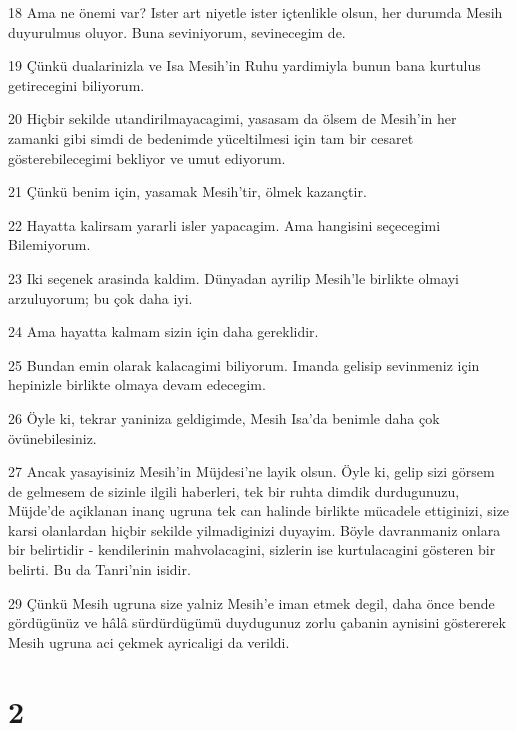\par 18 Ama ne önemi var? Ister art niyetle ister içtenlikle olsun, her durumda Mesih duyurulmus oluyor. Buna seviniyorum, sevinecegim de.
\par 19 Çünkü dualarinizla ve Isa Mesih'in Ruhu yardimiyla bunun bana kurtulus getirecegini biliyorum.
\par 20 Hiçbir sekilde utandirilmayacagimi, yasasam da ölsem de Mesih'in her zamanki gibi simdi de bedenimde yüceltilmesi için tam bir cesaret gösterebilecegimi bekliyor ve umut ediyorum.
\par 21 Çünkü benim için, yasamak Mesih'tir, ölmek kazançtir.
\par 22 Hayatta kalirsam yararli isler yapacagim. Ama hangisini seçecegimi Bilemiyorum.
\par 23 Iki seçenek arasinda kaldim. Dünyadan ayrilip Mesih'le birlikte olmayi arzuluyorum; bu çok daha iyi.
\par 24 Ama hayatta kalmam sizin için daha gereklidir.
\par 25 Bundan emin olarak kalacagimi biliyorum. Imanda gelisip sevinmeniz için hepinizle birlikte olmaya devam edecegim.
\par 26 Öyle ki, tekrar yaniniza geldigimde, Mesih Isa'da benimle daha çok övünebilesiniz.
\par 27 Ancak yasayisiniz Mesih'in Müjdesi'ne layik olsun. Öyle ki, gelip sizi görsem de gelmesem de sizinle ilgili haberleri, tek bir ruhta dimdik durdugunuzu, Müjde'de açiklanan inanç ugruna tek can halinde birlikte mücadele ettiginizi, size karsi olanlardan hiçbir sekilde yilmadiginizi duyayim. Böyle davranmaniz onlara bir belirtidir - kendilerinin mahvolacagini, sizlerin ise kurtulacagini gösteren bir belirti. Bu da Tanri'nin isidir.
\par 29 Çünkü Mesih ugruna size yalniz Mesih'e iman etmek degil, daha önce bende gördügünüz ve hâlâ sürdürdügümü duydugunuz zorlu çabanin aynisini göstererek Mesih ugruna aci çekmek ayricaligi da verildi.

\chapter{2}

